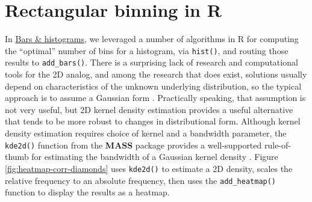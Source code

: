 \documentclass[
  12pt,
]{krantz}
\begin{document}
\hypertarget{rectangular-binning-in-r}{%
\section{Rectangular binning in R}\label{rectangular-binning-in-r}}

In \protect\hyperlink{bars-histograms}{Bars \& histograms}, we leveraged a number of algorithms in R for computing the ``optimal'' number of bins for a histogram, via \texttt{hist()}, and routing those results to \texttt{add\_bars()}. There is a surprising lack of research and computational tools for the 2D analog, and among the research that does exist, solutions usually depend on characteristics of the unknown underlying distribution, so the typical approach is to assume a Gaussian form \citep{mde}. Practically speaking, that assumption is not very useful, but 2D kernel density estimation provides a useful alternative that tends to be more robust to changes in distributional form. Although kernel density estimation requires choice of kernel and a bandwidth parameter, the \texttt{kde2d()} function from the \textbf{MASS} package provides a well-supported rule-of-thumb for estimating the bandwidth of a Gaussian kernel density \citep{MASS}. Figure \ref{fig:heatmap-corr-diamonds} uses \texttt{kde2d()} to estimate a 2D density, scales the relative frequency to an absolute frequency, then uses the \texttt{add\_heatmap()} function to display the results as a heatmap.

\end{document}
